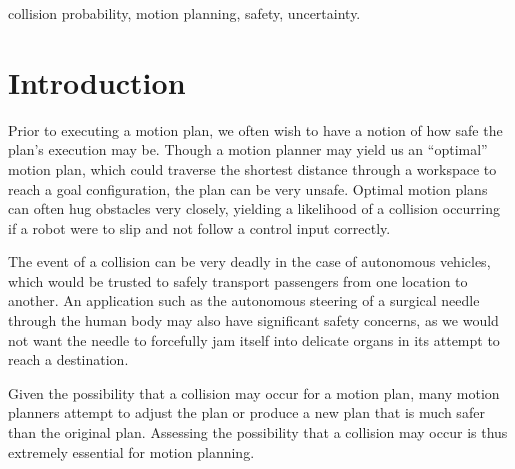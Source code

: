 \documentclass[journal]{IEEEtran}
\begin{document}
\begin{IEEEkeywords}
 collision probability, motion planning, safety, uncertainty.
\end{IEEEkeywords}

%
\IEEEpeerreviewmaketitle


\section{Introduction}
% 
% 
% 
% 
Prior to executing a motion plan, we often wish to have a notion of how safe the plan's execution may be. Though a motion planner may yield us an ``optimal'' motion plan, which could traverse the shortest distance through a workspace to reach a goal configuration, the plan can be very unsafe. Optimal motion plans can often hug obstacles very closely, yielding a likelihood of a collision occurring if a robot were to slip and not follow a control input correctly.

The event of a collision can be very deadly in the case of autonomous vehicles, which would be trusted to safely transport passengers from one location to another. An application such as the autonomous steering of a surgical needle through the human body may also have significant safety concerns, as we would not want the needle to forcefully jam itself into delicate organs in its attempt to reach a destination.

Given the possibility that a collision may occur for a motion plan, many motion planners attempt to adjust the plan or produce a new plan that is much safer than the original plan. Assessing the possibility that a collision may occur is thus extremely essential for motion planning.
\end{document}
